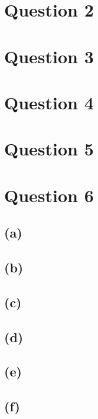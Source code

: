 \documentclass{article}
\begin{document}
\section*{\hfil Question 2}
\section*{\hfil Question 3}
\section*{\hfil Question 4}
\section*{\hfil Question 5}
\section*{\hfil Question 6}
\subsection*{(a)}

\subsection*{(b)}

\subsection*{(c)}

\subsection*{(d)}

\subsection*{(e)}

\subsection*{(f)}
\end{document}
